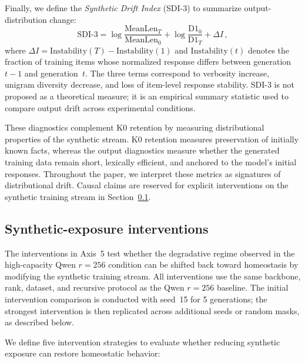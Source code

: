 \documentclass[a4paper,fleqn]{cas-dc}
\begin{document}
Finally, we define the \textit{Synthetic Drift Index} (SDI-3) to summarize
output-distribution change:
\begin{equation}\label{eq:sdi}
    \mathrm{SDI\text{-}3} =
    \log\frac{\mathrm{MeanLen}_T}{\mathrm{MeanLen}_0}
    + \log\frac{\mathrm{D1}_0}{\mathrm{D1}_T}
    + \Delta I\,,
\end{equation}
where $\Delta I = \mathrm{Instability}(T) -
\mathrm{Instability}(1)$ and $\mathrm{Instability}(t)$ denotes the fraction of
training items whose normalized response differs between generation~$t{-}1$ and
generation~$t$. The three terms correspond to verbosity increase, unigram
diversity decrease, and loss of item-level response stability. SDI-3 is not
proposed as a theoretical measure; it is an empirical summary statistic used to
compare output drift across experimental conditions.

These diagnostics complement K0 retention by measuring distributional properties
of the synthetic stream. K0 retention measures preservation of initially known
facts, whereas the output diagnostics measure whether the generated training
data remain short, lexically efficient, and anchored to the model's initial
responses. Throughout the paper, we interpret these metrics as signatures of
distributional drift. Causal claims are reserved for explicit interventions on
the synthetic training stream in Section~\ref{sec:intervention}.

\subsection{Synthetic-exposure interventions}\label{sec:intervention}

The interventions in Axis~5 test whether the degradative regime observed in the
high-capacity Qwen $r=256$ condition can be shifted back toward homeostasis by
modifying the synthetic training stream. All interventions use the same backbone,
rank, dataset, and recursive protocol as the Qwen $r=256$ baseline. The initial
intervention comparison is conducted with seed~15 for 5 generations; the
strongest intervention is then replicated across additional seeds or random
masks, as described below.

We define five intervention strategies to evaluate whether reducing synthetic
exposure can restore homeostatic behavior:
\end{document}
